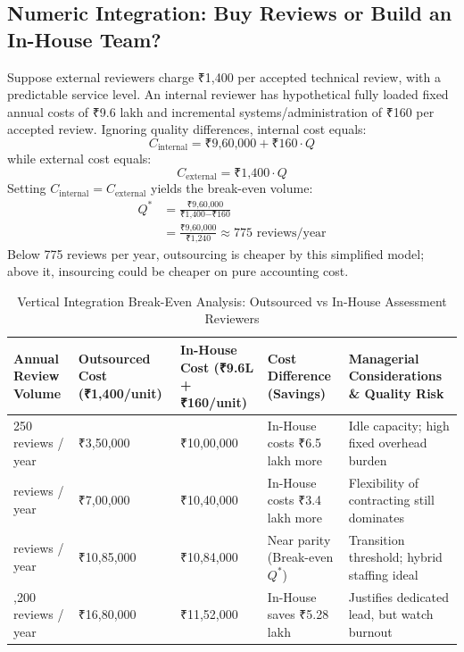 \subsection{Numeric Integration: Buy Reviews or Build an In-House Team?}
\label{sec:numeric_integration_decision_reviews}

Suppose external reviewers charge ₹1,400 per accepted technical review, with a predictable service level. An internal reviewer has hypothetical fully loaded fixed annual costs of ₹9.6 lakh and incremental systems/administration of ₹160 per accepted review. Ignoring quality differences, internal cost equals:
\begin{equation}
\label{eq:internal_cost_model}
C_{\text{internal}} = \text{₹9,60,000} + \text{₹160} \cdot Q
\end{equation}
while external cost equals:
\begin{equation}
\label{eq:external_cost_model}
C_{\text{external}} = \text{₹1,400} \cdot Q
\end{equation}
Setting $C_{\text{internal}} = C_{\text{external}}$ yields the break-even volume:
\begin{equation}
\label{eq:breakeven_volume}
\begin{aligned}
Q^* &= \frac{\text{₹9,60,000}}{\text{₹1,400} - \text{₹160}} \\
    &= \frac{\text{₹9,60,000}}{\text{₹1,240}} \approx 775 \text{ reviews/year}
\end{aligned}
\end{equation}
Below 775 reviews per year, outsourcing is cheaper by this simplified model; above it, insourcing could be cheaper on pure accounting cost.

\begin{table}[t]
\centering
\small
\caption{Vertical Integration Break-Even Analysis: Outsourced vs In-House Assessment Reviewers}
\label{tab:vertical_integration_breakeven}
\begin{tabularx}{\textwidth}{l p{2.4cm} p{2.6cm} p{2.8cm} X}
\toprule
\textbf{Annual Review Volume} & \textbf{Outsourced Cost (₹1,400/unit)} & \textbf{In-House Cost (₹9.6L + ₹160/unit)} & \textbf{Cost Difference (Savings)} & \textbf{Managerial Considerations \& Quality Risk} \\
\midrule
250 reviews / year & ₹3,50,000 & ₹10,00,000 & In-House costs ₹6.5 lakh more & Idle capacity; high fixed overhead burden \\
\addlinespace[2pt]
500 reviews / year & ₹7,00,000 & ₹10,40,000 & In-House costs ₹3.4 lakh more & Flexibility of contracting still dominates \\
\addlinespace[2pt]
775 reviews / year & ₹10,85,000 & ₹10,84,000 & Near parity (Break-even $Q^*$) & Transition threshold; hybrid staffing ideal \\
\addlinespace[2pt]
1,200 reviews / year & ₹16,80,000 & ₹11,52,000 & In-House saves ₹5.28 lakh & Justifies dedicated lead, but watch burnout \\
\bottomrule
\end{tabularx}
\end{table}

